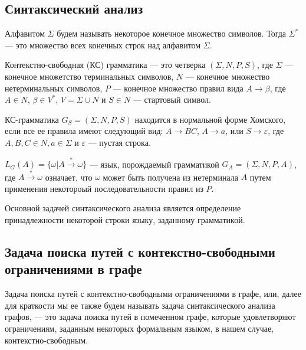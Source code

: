 \documentclass[12pt]{matmex-diploma-custom}
\begin{document}
\subsection{Синтаксический анализ}

Алфавитом $\Sigma$ будем называть некоторое конечное множество символов.
Тогда $\Sigma^{*}$ --- это множество всех конечных строк над алфавитом $\Sigma$.

Контекстно-свободная (КС) грамматика --- это четверка $(\Sigma, N, P, S)$, где $\Sigma$ --- конечное множетство терминальных символов, $N$ --- конечное множество нетерминальных символов, $P$ --- конечное множество правил вида $A \rightarrow \beta$, где $A \in N$, $\beta \in V^{*}$, $V = \Sigma \cup N$ и $S \in N$ --- стартовый символ.

КС-грамматика $G_S = (\Sigma, N, P, S)$ находится в нормальной форме Хомского, если все ее правила имеют следующий вид: $A \rightarrow BC$, $A \rightarrow a$, или $S \rightarrow \varepsilon$, 
где $A, B, C \in N, a \in \Sigma$ и $\varepsilon$ --- пустая строка.

$L_{G}(A) = \{ \omega | A\xrightarrow{*} \omega\}$ --- язык, порождаемый грамматикой $G_{A} = (\Sigma, N, P, A)$, где $A \xrightarrow{*} \omega$ означает, что $\omega$ может быть получена из нетерминала $A$ путем применения некотороый последовательности правил из $P$.

Основной задачей синтаксического анализа является определение принадлежности некоторой строки языку, заданному грамматикой.


\subsection{Задача поиска путей с контекстно-свободными ограничениями в графе}

Задача поиска путей с контекстно-свободными ограничениями в графе, или, далее для краткости мы ее также будем называть задача синтаксического анализа графов, --- это задача поиска путей в помеченном графе, которые удовлетворяют ограничениям, заданным некоторых формальным языком, в нашем случае, контекстно-свободным.
\end{document}
